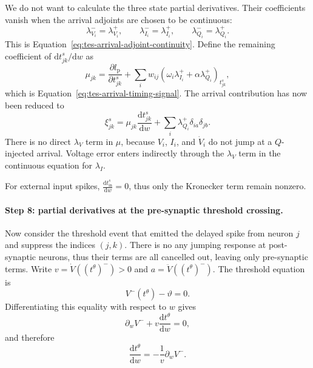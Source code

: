 We do not want to calculate the three state partial derivatives. Their
coefficients vanish when the arrival adjoints are chosen to be continuous:
\begin{equation}
    \lambda_{V_i}^-=\lambda_{V_i}^+,
    \qquad
    \lambda_{I_i}^-=\lambda_{I_i}^+,
    \qquad
    \lambda_{Q_i}^-=\lambda_{Q_i}^+.
    \label{eq:tes-arrival-adjoint-continuity-derived}
\end{equation}
This is Equation~\eqref{eq:tes-arrival-adjoint-continuity}. Define the
remaining coefficient of $\mathrm dt^s_{jk}/\mathrm dw$ as
\begin{equation}
    \mu_{jk}
      =\frac{\partial l_{\mathrm p}}{\partial t^s_{jk}}
       +\sum_i w_{ij}
        \left(\omega_i\lambda_{I_i}^+
              +\alpha\lambda_{Q_i}^+\right)_{t^s_{jk}},
    \label{eq:tes-arrival-timing-signal-derived}
\end{equation}
which is Equation~\eqref{eq:tes-arrival-timing-signal}. The arrival
contribution has now been reduced to
\begin{equation}
    \xi^s_{jk}
      =\mu_{jk}\frac{\mathrm dt^s_{jk}}{\mathrm dw}
       +\sum_i\lambda_{Q_i}^+
        \delta_{ia}\delta_{jb}.
    \label{eq:tes-arrival-after-cancellation}
\end{equation}
There is no direct $\lambda_V$ term in $\mu$, because $V_i$, $I_i$, and
$\dot V_i$ do not jump at a $Q$-injected arrival. Voltage error enters
indirectly through the $\lambda_V$ term in the continuous equation for
$\lambda_I$.

For external input spikes, $\frac{\mathrm dt^s_{\mathrm{in}}}{\mathrm dw} = 0$, thus only the Kronecker term remain nonzero.

\paragraph{Step 8: partial derivatives at the pre-synaptic threshold crossing.}
Now consider the threshold event that emitted the delayed spike from neuron $j$ and suppress the indices $(j,k)$. There is no any jumping response at post-synaptic neurons, thus their terms are all cancelled out, leaving only pre-synaptic terms. Write $v=\dot V((t^\theta)^-)>0$ and
$a=\ddot V((t^\theta)^-)$. The threshold equation is
\begin{equation}
    V^-(t^\theta)-\vartheta=0.
\end{equation}
Differentiating this equality with respect to $w$ gives
\begin{equation}
    \partial_wV^-+v\frac{\mathrm dt^\theta}{\mathrm dw}=0,
    \label{eq:tes-threshold-differentiated}
\end{equation}
and therefore
\begin{equation}
    \frac{\mathrm dt^\theta}{\mathrm dw}
      =-\frac{1}{v}\partial_wV^-.
    \label{eq:tes-threshold-time-variation}
\end{equation}

